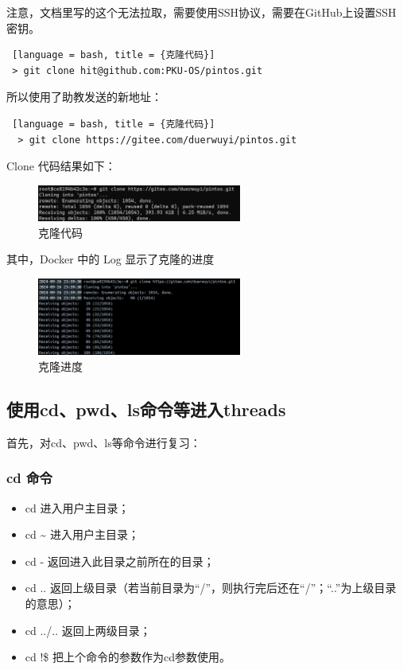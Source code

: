 注意，文档里写的这个无法拉取，需要使用SSH协议，需要在GitHub上设置SSH密钥。
\begin{lstlisting} [language = bash, title = {克隆代码}]
 > git clone hit@github.com:PKU-OS/pintos.git
\end{lstlisting}

所以使用了助教发送的新地址：
\begin{lstlisting} [language = bash, title = {克隆代码}]
  > git clone https://gitee.com/duerwuyi/pintos.git
\end{lstlisting}

Clone 代码结果如下：
\begin{figure} [H]
  \centering
  \includegraphics[width=0.6\textwidth]{img1/GitClone.png}
  \caption{克隆代码}
  \label{fig:clone}
\end{figure}

其中，Docker 中的 Log 显示了克隆的进度

\begin{figure} [H]
  \centering
  \includegraphics[width=0.6\textwidth]{img1/Schedule.png}
  \caption{克隆进度}
  \label{fig:schedule}
\end{figure}

\subsection{使用cd、pwd、ls命令等进入threads}

首先，对cd、pwd、ls等命令进行复习：

\subsubsection{cd 命令}
\begin{itemize} 
  \item cd 进入用户主目录； 
  \item cd \~{} 进入用户主目录； 
  \item cd - 返回进入此目录之前所在的目录； 
  \item cd .. 返回上级目录（若当前目录为“/”，则执行完后还在“/”；“..”为上级目录的意思）； 
  \item cd ../.. 返回上两级目录； 
  \item cd !\$ 把上个命令的参数作为cd参数使用。 
\end{itemize}

